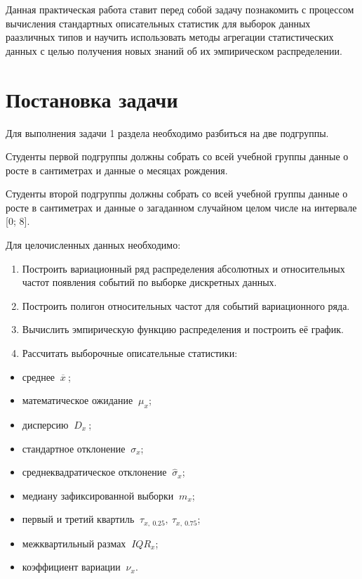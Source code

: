 \documentclass[
]{article}
\providecommand{\tightlist}{%
  \setlength{\itemsep}{0pt}\setlength{\parskip}{0pt}}
\begin{document}
Данная практическая работа ставит перед собой задачу познакомить с
процессом вычисления стандартных описательных статистик для выборок
данных раазличных типов и научить использовать методы агрегации
статистических данных с целью получения новых знаний об их эмпирическом
распределении.

\hypertarget{ux43fux43eux441ux442ux430ux43dux43eux432ux43aux430-ux437ux430ux434ux430ux447ux438}{%
\section{\texorpdfstring{\textbf{Постановка
задачи}}{Постановка задачи}}\label{ux43fux43eux441ux442ux430ux43dux43eux432ux43aux430-ux437ux430ux434ux430ux447ux438}}

Для выполнения задачи 1 раздела необходимо разбиться на две подгруппы.

Студенты первой подгруппы должны собрать со всей учебной группы данные о
росте в сантиметрах и данные о месяцах рождения.

Студенты второй подгруппы должны собрать со всей учебной группы данные о
росте в сантиметрах и данные о загаданном случайном целом числе на
интервале {[}0; 8{]}.

Для целочисленных данных необходимо:

\begin{enumerate}
\def\labelenumi{\arabic{enumi}.}
\item
  Построить вариационный ряд распределения абсолютных и относительных
  частот появления событий по выборке дискретных данных.
\item
  Построить полигон относительных частот для событий вариационного ряда.
\item
  Вычислить эмпирическую функцию распределения и построить её график.
\item
  Рассчитать выборочные описательные статистики:
\end{enumerate}

\begin{itemize}
\tightlist
\item
  среднее \(\ \overline{x}\ \);
\item
  математическое ожидание \(\ \mu_x\);
\item
  дисперсию \(\ D_{x}\ \);
\item
  стандартное отклонение \(\ \sigma_{x}\);
\item
  среднеквадратическое отклонение \(\ \hat{\sigma}_x\);
\item
  медиану зафиксированной выборки \(\ m_x\);
\item
  первый и третий квартиль \(\ \tau_{x,\ 0.25},\ \tau_{x,\ 0.75}\);
\item
  межквартильный размах \(\ IQR_x\);
\item
  коэффициент вариации \(\ \nu_{x}\).
\end{itemize}
\end{document}
